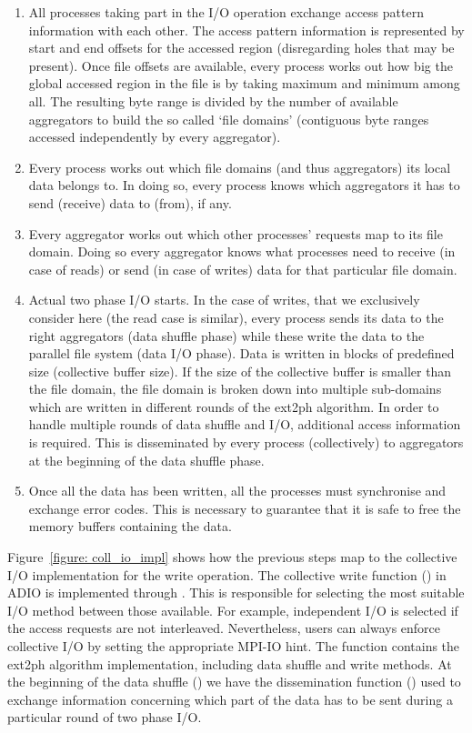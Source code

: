 \begin{enumerate}
\item All processes taking part in the I/O operation exchange access pattern information with each other. The access pattern information is represented by start and end offsets for the accessed region (disregarding holes that may be present). Once file offsets are available, every process works out how big the global accessed region in the file is by taking maximum and minimum among all. The resulting byte range is divided by the number of available aggregators to build the so called `file domains' (contiguous byte ranges accessed independently by every aggregator).
\item Every process works out which file domains (and thus aggregators) its local data belongs to. In doing so, every process knows which aggregators it has to send (receive) data to (from), if any.
\item Every aggregator works out which other processes' requests map to its file domain. Doing so every aggregator knows what processes need to receive (in case of reads) or send (in case of writes) data for that particular file domain.
\item Actual two phase I/O starts. In the case of writes, that we exclusively consider here (the read case is similar), every process sends its data to the right aggregators (data shuffle phase) while these write the data to the parallel file system (data I/O phase). Data is written in blocks of predefined size (collective buffer size). If the size of the collective buffer is smaller than the file domain, the file domain is broken down into multiple sub-domains which are written in different rounds of the ext2ph algorithm. In order to handle multiple rounds of data shuffle and I/O, additional access information is required. This is disseminated by every process (collectively) to aggregators at the beginning of the data shuffle phase.
\item Once all the data has been written, all the processes must synchronise and exchange error codes. This is necessary to guarantee that it is safe to free the memory buffers containing the data.
\end{enumerate}

Figure~\ref{figure: coll_io_impl} shows how the previous steps map to the collective I/O implementation for the write operation. The collective write function () in ADIO is implemented through . This is responsible for selecting the most suitable I/O method between those available. For example, independent I/O is selected if the access requests are not interleaved. Nevertheless, users can always enforce collective I/O by setting the appropriate MPI-IO hint. The  function contains the ext2ph algorithm implementation, including data shuffle and write methods. At the beginning of the data shuffle () we have the dissemination function () used to exchange information concerning which part of the data has to be sent during a particular round of two phase I/O. 

